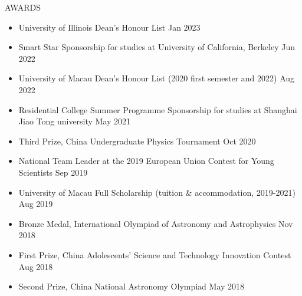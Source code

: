 \documentclass[11pt]{article}
\begin{document}
\begin{section}{AWARDS}

    \begin{itemize}[leftmargin=1.5em]
        \item University of Illinois Dean's Honour List \hfill Jan 2023
        \item Smart Star Sponsorship for studies at University of California, Berkeley \hfill Jun 2022
        \item University of Macau Dean's Honour List (2020 first semester and 2022) \hfill Aug 2022
        \item Residential College Summer Programme Sponsorship for studies at Shanghai Jiao Tong university \hfill May 2021
        \item Third Prize, China Undergraduate Physics Tournament \hfill Oct 2020
        \item National Team Leader at the 2019 European Union Contest for Young Scientists \hfill Sep 2019
        \item University of Macau Full Scholarship (tuition \& accommodation, 2019-2021) \hfill Aug 2019
        \item Bronze Medal, International Olympiad of Astronomy and Astrophysics \hfill Nov 2018
        \item First Prize, China Adolescents' Science and Technology Innovation Contest \hfill Aug 2018
        \item Second Prize, China National Astronomy Olympiad \hfill May 2018
    \end{itemize}
    
\end{section}
\end{document}
